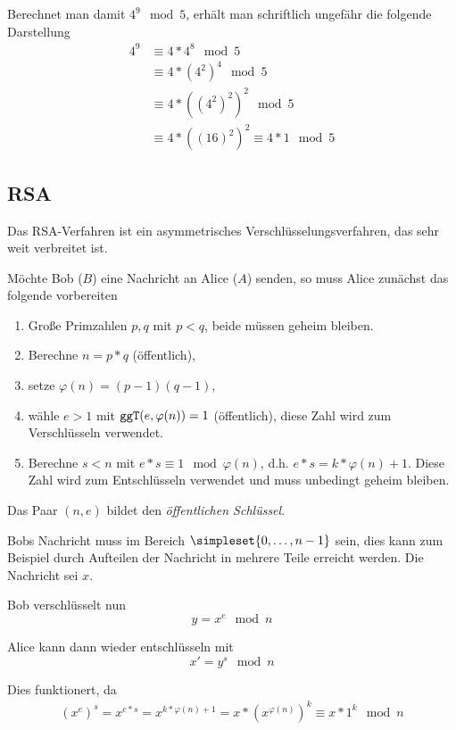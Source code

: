 Berechnet man damit $4^9\mod 5$, erhält man schriftlich ungefähr die folgende Darstellung
\begin{align*}
	4^9&\equiv 4*4^8\mod 5\\
	&\equiv 4*(4^2)^4\mod 5\\
	&\equiv 4*((4^2)^2)^2\mod 5\\
	&\equiv 4*((16)^2)^2\equiv 4*1\mod 5
\end{align*}


\subsection{RSA}
Das RSA-Verfahren ist ein asymmetrisches Verschlüsselungsverfahren, das sehr weit verbreitet ist.

Möchte Bob  ($B$) eine Nachricht an Alice ($A$) senden, so muss Alice zunächst das folgende vorbereiten 
\begin{enumerate}
	\item Große Primzahlen $p,q$ mit $p<q$, beide müssen geheim bleiben.
	\item Berechne $n=p*q$ (öffentlich),
	\item setze $\varphi(n)=(p-1)(q-1)$,
	\item wähle $e>1$ mit $\texttt{ggT}(e,\varphi(n))=1$ (öffentlich), diese Zahl wird zum Verschlüsseln verwendet.
	\item Berechne $s<n$ mit $e*s\equiv 1\mod \varphi(n)$, d.h. $e*s=k*\varphi(n)+1$. Diese Zahl wird zum Entschlüsseln verwendet und muss unbedingt geheim bleiben.
\end{enumerate}
Das Paar $(n,e)$ bildet den \emph{öffentlichen Schlüssel}.

Bobs Nachricht muss im Bereich $\simpleset{0,\ldots,n-1}$ sein, dies kann zum Beispiel durch Aufteilen der Nachricht in mehrere Teile erreicht werden. Die Nachricht sei $x$.

Bob verschlüsselt nun
\begin{equation*}
	y=x^e\mod n
\end{equation*}

Alice kann dann wieder entschlüsseln mit
\begin{equation*}
	x'=y^s\mod n
\end{equation*}

Dies funktionert, da
\begin{align*}
	(x^e)^s = x^{e*s}=x^{k*\varphi(n)+1}=x*(x^{\varphi(n)})^k\equiv x*1^k\mod n
\end{align*}